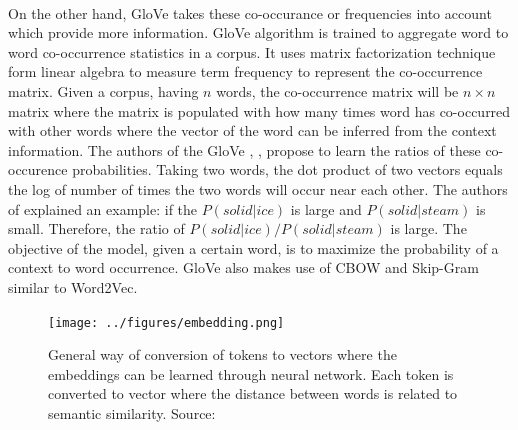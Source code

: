\documentclass[sigconf, nonacm, natbib, screen, balance=False]{acmart}
\begin{document}
\hfill\\
On the other hand, GloVe takes these co-occurance or frequencies into account which provide more information. GloVe algorithm is trained to aggregate word to word co-occurrence statistics in a corpus. It uses matrix factorization technique form linear algebra to measure term frequency to represent the co-occurrence matrix. Given a corpus, having $n$ words, the co-occurrence matrix will be $n \times n$ matrix where the matrix is populated with how many times word has co-occurred with other words where the vector of the word can be inferred from the context information. The authors of the GloVe , \citep{glovepaper}, propose to learn the ratios of these co-occurence probabilities. Taking two words, the dot product of two vectors equals the log of number of times the two words will occur near each other. The authors of \citep{glovepaper} explained an example: if the $P(solid|ice)$ is large and $P(solid|steam)$ is small. Therefore, the ratio of $P(solid|ice)/P(solid|steam)$ is large. The objective of the model, given a certain word, is to maximize the probability of a context to word occurrence. GloVe also makes use of CBOW and Skip-Gram similar to Word2Vec.

\begin{figure}
  \centering
  \texttt{[image: ../figures/embedding.png]}
  \caption{General way of conversion of tokens to vectors where the embeddings can be learned through neural network. Each token is converted to vector where the distance between words is related to semantic similarity. Source: \citep{raschka2019python}}
  \label{fig:embedding}
\end{figure}
\end{document}
